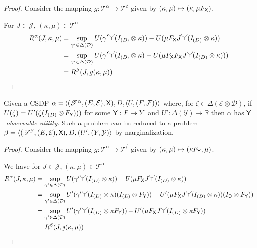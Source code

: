 \begin{proof}
Consider the mapping $g:\mathscr{T}^\alpha\to\mathscr{T}^\beta$ given by $(\kappa,\mu)\mapsto (\kappa ,\mu F_{\mathsf{X}})$.

For $J\in \mathscr{J}$, $(\kappa,\mu)\in\mathscr{T}^\alpha$
\begin{align}
    R^\alpha(J,\kappa,\mu) &= \sup_{\gamma'\in\Delta(\mathcal{D})} U(\gamma'\splitter{0.15}(I_{(D)}\otimes\kappa)) - U(\mu F_{\RV{X}} J\splitter{0.15}(I_{(D)}\otimes\kappa))\\
                           &= \sup_{\gamma'\in\Delta(\mathcal{D})} U(\gamma'\splitter{0.15}(I_{(D)}\otimes\kappa) - U(\mu F_{\RV{X}} F_{\RV{X}} J\splitter{0.15} (I_{(D)}\otimes\kappa)))\\
                           &= R^\beta (J,g(\kappa,\mu))
\end{align}
\end{proof}

\begin{theorem}\label{th:CSDP_u_red}
Given a CSDP $\alpha=\langle (\mathscr{T}^\alpha,(E,\mathcal{E}),\mathsf{X}),D,(U,(F,\mathcal{F}))\rangle$ where, for $\zeta\in \Delta(\mathcal{E}\otimes\mathcal{D})$, if $U(\zeta)=U'(\zeta(I_{(D)}\otimes F_{\mathsf{Y}}) ))$ for some $\mathsf{Y}: F\to Y$ and $U':\Delta(\mathcal{Y})\to \mathbb{R}$ then $\alpha$ has $\mathsf{Y}$-\emph{observable utility}. Such a problem can be reduced to a problem $\beta=\langle (\mathscr{T}^\beta,(E,\mathcal{E}),\mathsf{X}),D,(U',(Y,\mathcal{Y})\rangle$ by marginalization. 
\end{theorem}

\begin{proof}
Consider the mapping $g:\mathscr{T}^\alpha\to\mathscr{T}^\beta$ given by $(\kappa,\mu)\mapsto (\kappa F_{\mathsf{Y}},\mu)$.

We have for $J\in \mathscr{J}$, $(\kappa,\mu)\in\mathscr{T}^\alpha$
\begin{align}
    R^\alpha(J,\kappa,\mu) &= \sup_{\gamma'\in\Delta(\mathcal{D})} U(\gamma'\splitter{0.15}(I_{(D)}\otimes\kappa)) - U(\mu F_{\RV{X}} J\splitter{0.15}(I_{(D)}\otimes\kappa))\\
                           &= \sup_{\gamma'\in\Delta(\mathcal{D})} U'(\gamma'\splitter{0.15}(I_{(D)}\otimes\kappa)(I_{(D)} \otimes  F_{\RV{Y}})) - U'(\mu F_{\RV{X}} J\splitter{0.15} (I_{(D)}\otimes\kappa))(I_{\RV{D}}\otimes F_{\RV{Y}}))\\
                           &= \sup_{\gamma'\in\Delta(\mathcal{D})} U'(\gamma'\splitter{0.15}(I_{(D)}\otimes \kappa F_{\RV{Y}})) - U'(\mu F_{\RV{X}} J\splitter{0.15}(I_{(D)}\otimes \kappa F_{\RV{Y}}))\\
                           &= R^\beta (J,g(\kappa,\mu))
\end{align}
\end{proof}

